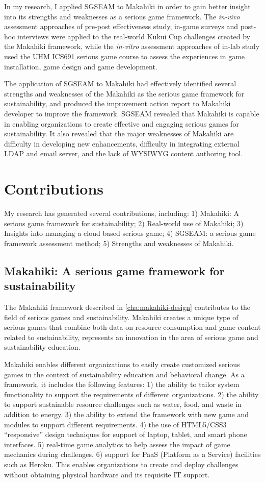 In my research, I applied SGSEAM to Makahiki in order to gain better insight into its strengths and weaknesses as a serious game framework. The {\em in-vivo} assessment approaches of pre-post effectiveness study, in-game surveys and post-hoc interviews were applied to the real-world Kukui Cup challenges created by the Makahiki framework, while the {\em in-vitro} assessment approaches of in-lab study used the UHM ICS691 serious game course to assess the experiences in game installation, game design and game development. 

The application of SGSEAM to Makahiki had effectively identified several strengths and weaknesses of the Makahiki as the serious game framework for sustainability, and produced the improvement action report to Makahiki developer to improve the framework. SGSEAM revealed that Makahiki is capable in enabling organizations to create effective and engaging serious games for sustainability. It also revealed that the major weaknesses of Makahiki are difficulty in developing new enhancements,  difficulty in integrating external LDAP and email server, and the lack of WYSIWYG content authoring tool.

\section{Contributions}

My research has generated several contributions, including: 1) Makahiki: A serious game framework for sustainability; 2) Real-world use of Makahiki;  3) Insights into managing a cloud based serious game; 4) SGSEAM: a serious game framework assessment method; 5) Strengths and weaknesses of Makahiki.

\subsection{Makahiki: A serious game framework for sustainability}

The Makahiki framework described in \autoref{cha:makahiki-design} contributes to the field of serious games
and sustainability. Makahiki creates a unique type of serious games that combine
both data on resource consumption and game content related to sustainability, represents an innovation in the area of serious game and sustainability education. 

Makahiki enables different organizations to easily create customized serious games in the context of sustainability education and behavioral change. As a framework, it includes the following features: 1) the ability to tailor system functionality to support the requirements of different organizations. 2) the ability to support sustainable resource challenges such as water, food, and waste in addition to energy. 3) the ability to extend the framework with new game and modules to support different requirements. 4) the use of HTML5/CSS3 ``responsive'' design techniques for support of laptop, tablet, and smart phone interfaces. 5) real-time game analytics to help assess the impact of game mechanics during challenges. 6) support for PaaS (Platform as a Service) facilities such as Heroku. This enables organizations to create and deploy challenges without obtaining physical hardware and its requisite IT support.

